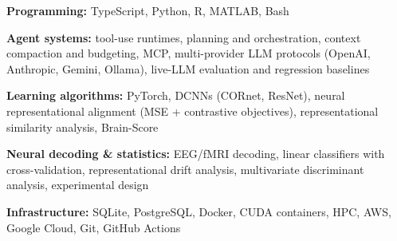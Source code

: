 \textbf{Programming:} TypeScript, Python, R, MATLAB, Bash\par
\textbf{Agent systems:} tool-use runtimes, planning and orchestration, context compaction and budgeting, MCP, multi-provider LLM protocols (OpenAI, Anthropic, Gemini, Ollama), live-LLM evaluation and regression baselines\par
\textbf{Learning algorithms:} PyTorch, DCNNs (CORnet, ResNet), neural representational alignment (MSE + contrastive objectives), representational similarity analysis, Brain-Score\par
\textbf{Neural decoding \& statistics:} EEG/fMRI decoding, linear classifiers with cross-validation, representational drift analysis, multivariate discriminant analysis, experimental design\par
{}
\textbf{Infrastructure:} SQLite, PostgreSQL, Docker, CUDA containers, HPC, AWS, Google Cloud, Git, GitHub Actions\par
